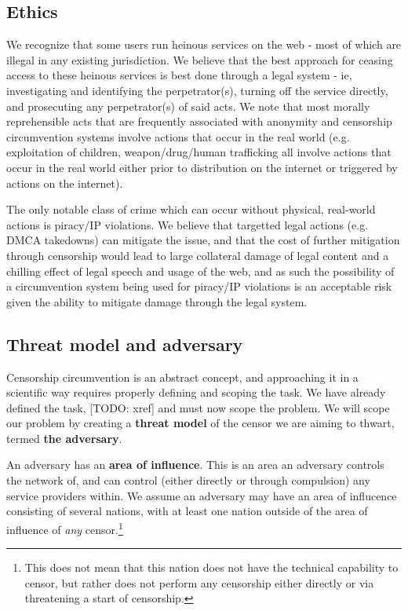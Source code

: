 \documentclass[12pt]{report}
\begin{document}
\subsection{Ethics}

We recognize that some users run heinous services on the web - most of which are illegal in any existing jurisdiction. We believe that the best approach for ceasing access to these heinous services is best done through a legal system - ie, investigating and identifying the perpetrator(s), turning off the service directly, and prosecuting any perpetrator(s) of said acts. We note that most morally reprehensible acts that are frequently associated with anonymity and censorship circumvention systems involve actions that occur in the real world (e.g. exploitation of children, weapon/drug/human trafficking all involve actions that occur in the real world either prior to distribution on the internet or triggered by actions on the internet).

The only notable class of crime which can occur without physical, real-world actions is piracy/IP violations. We believe that targetted legal actions (e.g. DMCA takedowns) can mitigate the issue, and that the cost of further mitigation through censorship would lead to large collateral damage of legal content and a chilling effect of legal speech and usage of the web, and as such the possibility of a circumvention system being used for piracy/IP violations is an acceptable risk given the ability to mitigate damage through the legal system.

\subsection{Threat model and adversary}

Censorship circumvention is an abstract concept, and approaching it in a scientific way requires properly defining and scoping the task. We have already defined the task, [TODO: xref] and must now scope the problem. We will scope our problem by creating a \textbf{threat model} of the censor we are aiming to thwart, termed \textbf{the adversary}.

An adversary has an \textbf{area of influence}. This is an area an adversary controls the network of, and can control (either directly or through compulsion) any service providers within. We assume an adversary may have an area of influcence consisting of several nations, with at least one nation outside of the area of influence of \emph{any} censor.\footnote{This does not mean that this nation does not have the technical capability to censor, but rather does not perform any censorship either directly or via threatening a start of censorship.}
\end{document}
